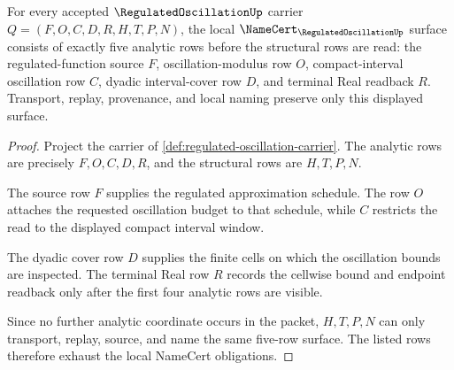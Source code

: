 \begin{theorem}
\label{thm:regulated-oscillation-namecert-obligations}
For every accepted $\RegulatedOscillationUp$ carrier $Q=(F,O,C,D,R,H,T,P,N)$, the local $\NameCert_{\RegulatedOscillationUp}$ surface consists of exactly five analytic rows before the structural rows are read: the regulated-function source $F$, oscillation-modulus row $O$, compact-interval oscillation row $C$, dyadic interval-cover row $D$, and terminal Real readback $R$. Transport, replay, provenance, and local naming preserve only this displayed surface.
\end{theorem}
\begin{proof}
Project the carrier of \autoref{def:regulated-oscillation-carrier}. The analytic rows are precisely $F,O,C,D,R$, and the structural rows are $H,T,P,N$.

The source row $F$ supplies the regulated approximation schedule. The row $O$ attaches the requested oscillation budget to that schedule, while $C$ restricts the read to the displayed compact interval window.

The dyadic cover row $D$ supplies the finite cells on which the oscillation bounds are inspected. The terminal Real row $R$ records the cellwise bound and endpoint readback only after the first four analytic rows are visible.

Since no further analytic coordinate occurs in the packet, $H,T,P,N$ can only transport, replay, source, and name the same five-row surface. The listed rows therefore exhaust the local NameCert obligations.
\end{proof}

